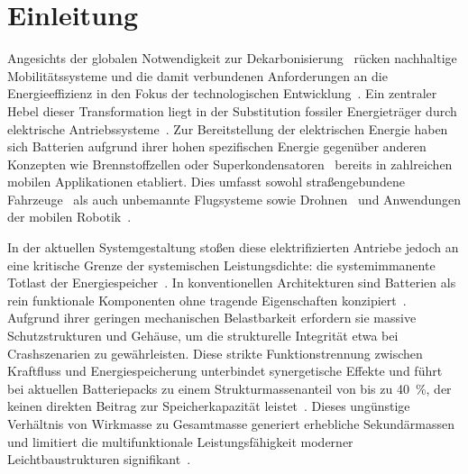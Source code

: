 \chapter[Einleitung]{\label{sec:Einleitung}Einleitung}
Angesichts der globalen Notwendigkeit zur Dekarbonisierung~\cite{MacDowell2017} rücken nachhaltige Mobilitätssysteme und die damit verbundenen Anforderungen an die Energieeffizienz in den Fokus der technologischen Entwicklung~\cite{Owusu2016}. Ein zentraler Hebel dieser Transformation liegt in der Substitution fossiler Energieträger durch elektrische Antriebssysteme~\cite{Sugiyama2012}. Zur Bereitstellung der elektrischen Energie haben sich Batterien aufgrund ihrer hohen spezifischen Energie gegenüber anderen Konzepten wie Brennstoffzellen oder Superkondensatoren~\cite{Winter2004, Hemmati2016, Salkuti2023} bereits in zahlreichen mobilen Applikationen etabliert. Dies umfasst sowohl straßengebundene Fahrzeuge~\cite{Huo2015, Donateo2015, Jochem2015} als auch unbemannte Flugsysteme sowie Drohnen~\cite{VincentWong2015, Boukoberine2019, Pham2022, Wang2022} und Anwendungen der mobilen Robotik~\cite{Hecht2023, Mikolajczyk2023, Ghobadpour2023, Wang2020}.


In der aktuellen Systemgestaltung stoßen diese elektrifizierten Antriebe jedoch an eine kritische Grenze der systemischen Leistungsdichte: die systemimmanente Totlast der Energiespeicher~\cite{Foiadelli2018}. In konventionellen Architekturen sind Batterien als rein funktionale Komponenten ohne tragende Eigenschaften konzipiert~\cite{VanMierlo2007, Xu2022}. Aufgrund ihrer geringen mechanischen Belastbarkeit erfordern sie massive Schutzstrukturen und Gehäuse, um die strukturelle Integrität etwa bei Crashszenarien zu gewährleisten. Diese strikte Funktionstrennung zwischen Kraftfluss und Energiespeicherung unterbindet synergetische Effekte und führt bei aktuellen Batteriepacks zu einem Strukturmassenanteil von bis zu 40~\%, der keinen direkten Beitrag zur Speicherkapazität leistet~\cite{Radu2021, Audi2022}. Dieses ungünstige Verhältnis von Wirkmasse zu Gesamtmasse generiert erhebliche Sekundärmassen und limitiert die multifunktionale Leistungsfähigkeit moderner Leichtbaustrukturen signifikant~\cite{Armand2020, Schaefer2018, Cano2018, Goodenough2009}.

